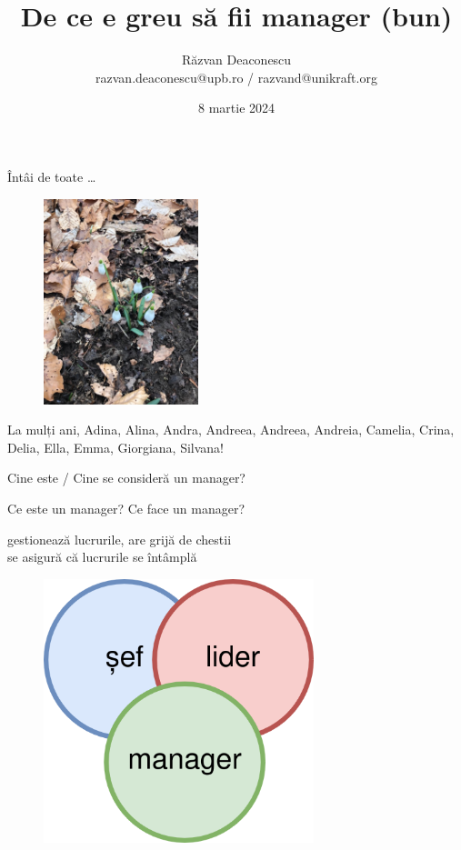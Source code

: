 \documentclass{simple}
\title[Despre manager]{De ce e greu să fii manager (bun)}
\institute{Excursie, Poiana Țapului}
\author[Răzvan Deaconescu]{Răzvan Deaconescu \\
razvan.deaconescu@upb.ro / razvand@unikraft.org}
\date{8 martie 2024}
\begin{document}
\frame{\titlepage}

\begin{frame}{Întâi de toate \ldots}
  \begin{figure}
    \centering
    \includegraphics[width=0.4\textwidth]{img/snowdrop.jpg}
  \end{figure}
  \begin{center}
    La mulți ani, Adina, Alina, Andra, Andreea, Andreea, Andreia, Camelia, Crina, Delia, Ella, Emma, Giorgiana, Silvana!
  \end{center}
\end{frame}

\begin{frame}{}
  \begin{center}
    Cine este / Cine se consideră un manager?
  \end{center}
\end{frame}

\begin{frame}{Ce este un manager? Ce face un manager?}
  \begin{center}
    \pause
    gestionează lucrurile, are grijă de chestii \\
    \vspace{1cm}
    \pause
    se asigură că lucrurile se întâmplă
  \end{center}
\end{frame}

\begin{frame}{}
  \begin{figure}
    \centering
    \includegraphics[width=0.7\textwidth]{img/sef-lider-manager.drawio.png}
  \end{figure}
\end{frame}
\end{document}
